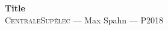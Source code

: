 \documentclass[12pt,oneside,a4paper]{article}
\begin{document}
\begin{center}
{\LARGE \bfseries
 Title \\[0.3cm]
}
{\large
  \textsc{CentraleSupélec} --- Max Spahn --- P2018\\[0.7cm]
}
\end{center}
\begin{comment}
Introduction
	Recap project 
	What were the difficulties/challenges?
UML-Diagram
	Complete UML-Diagram
	Explanations
	Design patterns used
Division of work
	Packages
	Steps
JUnit-Tests
	procedure
	the plugin we choose
	code coverage
Command-Line-Tool
Graphical User interface
User's guide
	CLUI
	Test-Scenario and ini-file
	GUI
Problems encounterd
Annexe
	Code examples
	Video of the GUI
\end{comment}
%


{\hypersetup{linkcolor=black} \tableofcontents}


\end{document}
